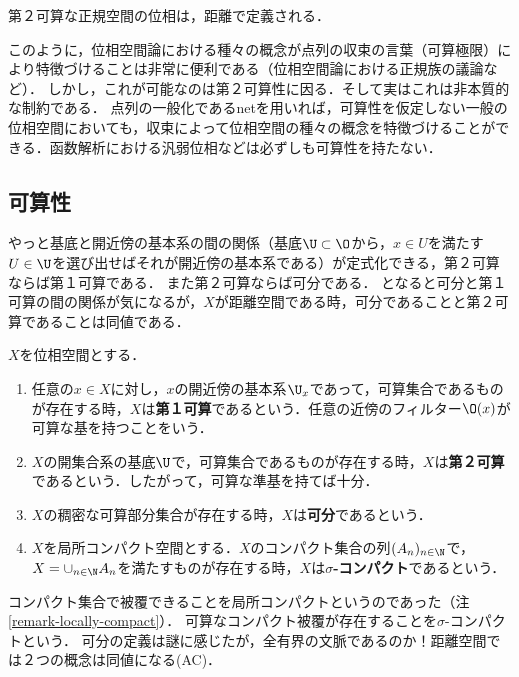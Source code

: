 \documentclass[uplatex,dvipdfmx]{jsreport}
\begin{document}
\begin{tcolorbox}[colframe=ForestGreen, colback=ForestGreen!10!white, breakable ,colbacktitle=ForestGreen!40!white, coltitle=black,fonttitle=\bfseries\sffamily
    ,title=filterの聖域]
    第２可算な正規空間の位相は，距離で定義される．

    このように，位相空間論における種々の概念が点列の収束の言葉（可算極限）により特徴づけることは非常に便利である（位相空間論における正規族の議論など）．
    しかし，これが可能なのは第２可算性に因る．そして実はこれは非本質的な制約である．
    点列の一般化であるnetを用いれば，可算性を仮定しない一般の位相空間においても，収束によって位相空間の種々の概念を特徴づけることができる．函数解析における汎弱位相などは必ずしも可算性を持たない．
\end{tcolorbox}

\subsection{可算性}

\begin{tcolorbox}[colframe=ForestGreen, colback=ForestGreen!10!white, breakable ,colbacktitle=ForestGreen!40!white, coltitle=black,fonttitle=\bfseries\sffamily
    ,title=filterの聖域]
    やっと基底と開近傍の基本系の間の関係（基底$\U\subset\O$から，$x\in U$を満たす$U\in\U$を選び出せばそれが開近傍の基本系である）が定式化できる，第２可算ならば第１可算である．
    また第２可算ならば可分である．
    となると可分と第１可算の間の関係が気になるが，$X$が距離空間である時，可分であることと第２可算であることは同値である．
\end{tcolorbox}

\begin{definition}
    $X$を位相空間とする．
    \begin{enumerate}
        \item 任意の$x\in X$に対し，$x$の開近傍の基本系$\U_x$であって，可算集合であるものが存在する時，$X$は\textbf{第１可算}であるという．任意の近傍のフィルター$\O(x)$が可算な基を持つことをいう．
        \item $X$の開集合系の基底$\U$で，可算集合であるものが存在する時，$X$は\textbf{第２可算}であるという．したがって，可算な準基を持てば十分．
        \item $X$の稠密な可算部分集合が存在する時，$X$は\textbf{可分}であるという．
        \item $X$を局所コンパクト空間とする．$X$のコンパクト集合の列$(A_n)_{n\in\N}$で，$X=\cup_{n\in\N}A_n$を満たすものが存在する時，$X$は\textbf{$\sigma$-コンパクト}であるという．
    \end{enumerate}
\end{definition}
\begin{remarks}
    コンパクト集合で被覆できることを局所コンパクトというのであった（注\ref{remark-locally-compact}）．
    可算なコンパクト被覆が存在することを$\sigma$-コンパクトという．
    可分の定義は謎に感じたが，全有界の文脈であるのか！距離空間では２つの概念は同値になる(AC)．
\end{remarks}
\end{document}
